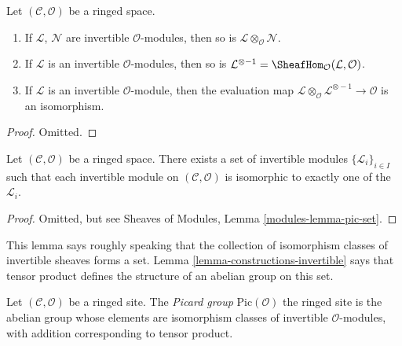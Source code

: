 \begin{lemma}
\label{lemma-constructions-invertible}
Let $(\mathcal{C}, \mathcal{O})$ be a ringed space.
\begin{enumerate}
\item If $\mathcal{L}$, $\mathcal{N}$ are invertible
$\mathcal{O}$-modules, then so is
$\mathcal{L} \otimes_\mathcal{O} \mathcal{N}$.
\item If $\mathcal{L}$ is an invertible
$\mathcal{O}$-modules, then so is
$\mathcal{L}^{\otimes -1}
= \SheafHom_\mathcal{O}(\mathcal{L}, \mathcal{O})$.
\item If $\mathcal{L}$ is an invertible
$\mathcal{O}$-module, then the evaluation map
$\mathcal{L} \otimes_\mathcal{O} \mathcal{L}^{\otimes -1}
\to \mathcal{O}$ is an isomorphism.
\end{enumerate}
\end{lemma}

\begin{proof}
Omitted.
\end{proof}

\begin{lemma}
\label{lemma-pic-set}
Let $(\mathcal{C}, \mathcal{O})$ be a ringed space.
There exists a set of invertible modules $\{\mathcal{L}_i\}_{i \in I}$
such that each invertible module on $(\mathcal{C}, \mathcal{O})$
is isomorphic to exactly one of the $\mathcal{L}_i$.
\end{lemma}

\begin{proof}
Omitted, but see Sheaves of Modules, Lemma \ref{modules-lemma-pic-set}.
\end{proof}

\noindent
This lemma says roughly speaking that the collection of
isomorphism classes of invertible sheaves forms a set.
Lemma \ref{lemma-constructions-invertible} says that
tensor product defines the structure of an abelian group
on this set.

\begin{definition}
\label{definition-pic}
Let $(\mathcal{C}, \mathcal{O})$ be a ringed site.
The {\it Picard group} $\text{Pic}(\mathcal{O})$
the ringed site is the
abelian group whose elements are isomorphism classes of
invertible $\mathcal{O}$-modules, with addition
corresponding to tensor product.
\end{definition}









